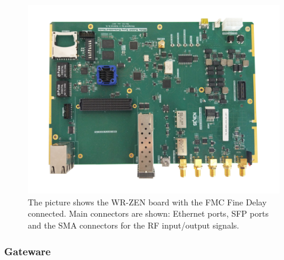 
\begin{figure}[H]
    \centering
    \includegraphics[width=0.7\linewidth]{img/wrzenv3_scaled}
    \caption[WR-ZEN board picture]{The picture shows the WR-ZEN board with the FMC Fine Delay connected. Main connectors are shown: Ethernet ports, SFP ports and the SMA connectors for the RF input/output signals.}
    \label{fig:wrzen}
\end{figure}


\subsubsection{Gateware}

%
%

